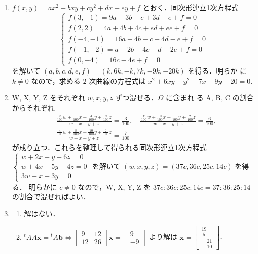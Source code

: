 \documentclass[11pt, uplatex, dvipdfmx]{jsarticle}
\begin{document}
\begin{enumerate}
\item $f(x,y) = ax^2+bxy+cy^2+dx+ey+f$ とおく．同次形連立1次方程式
  \[
    \begin{cases}
      f(3,-1) = 9a-3b+c+3d-e+f=0\\
      f(2,2)=4a+4b+4c+ed+ee+f=0\\
      f(-4,-1)=16a+4b+c-4d-e+f=0\\
      f(-1,-2)=a+2b+4c-d-2e+f=0\\
      f(0,-4)=16c-4e+f=0
    \end{cases}
  \]
  を解いて $(a,b,c,d,e,f) = ( k, 6k, -k, 7k, -9k, -20k)$ を得る．明らか
  に $k\neq 0$ なので，求める $2$ 次曲線の方程式は $x^2+6xy-y^2+7x-9y-20=0$.
  
\item W, X, Y, Z をそれぞれ $w, x, y, z$ ずつ混ぜる．$\Omega$ に含まれ
  る A, B, C の割合からそれぞれ
  \[
    \begin{aligned}
      &\frac{ \frac{2}{100}w + \frac{1}{100}x + \frac{4}{100}y +
      \frac{9}{100}z}{w+x+y+z} = \frac{3}{100}, \quad 
      \frac{\frac{7}{100}w+\frac{10}{100}x+\frac{1}{100}y
      + \frac{2}{100}z}{w+x+y+z}=\frac{6}{100},\\
      &\frac{\frac{4}{100}w+\frac{8}{100}x+\frac{10}{100}y+\frac{7}{100}z}{w+x+y+z}
      =\frac{7}{100}
    \end{aligned}
  \]
  が成り立つ．これらを整理して得られる同次形連立1次方程式 $\begin{cases}
      w+2x-y-6z=0\\
      w+4x-5y-4z=0\\
      3w-x-3y=0
  \end{cases}$ を解いて $(w,x,y,z) = (37c, 36c, 25c,  14c)$ を得る．
  明らかに $c \neq 0$ なので，W, X, Y,
  Z を $37c:36c:25c:14c = 37:36:25:14$ の割合で混ぜればよい．


\item
  \begin{enumerate}[(1)]
    \setlength{\itemsep}{1ex}
    
  \item 解はない．

  \item ${}^{t} A A \bm{x} = {}^{t}A\bm{b} \Leftrightarrow \left[
      \begin{array}{rr}
        9 & 12\\
        12 & 26
      \end{array}
    \right] \bm{x} = \left[
      \begin{array}{r}
        9\\
        -9
      \end{array}
    \right]$ より解は $\bm{x} = \left[
      \begin{array}{r}
        \frac{19}{5}\\
        -\frac{21}{10}
      \end{array}
    \right]$.
      

\end{enumerate}
\end{enumerate}
\end{document}
